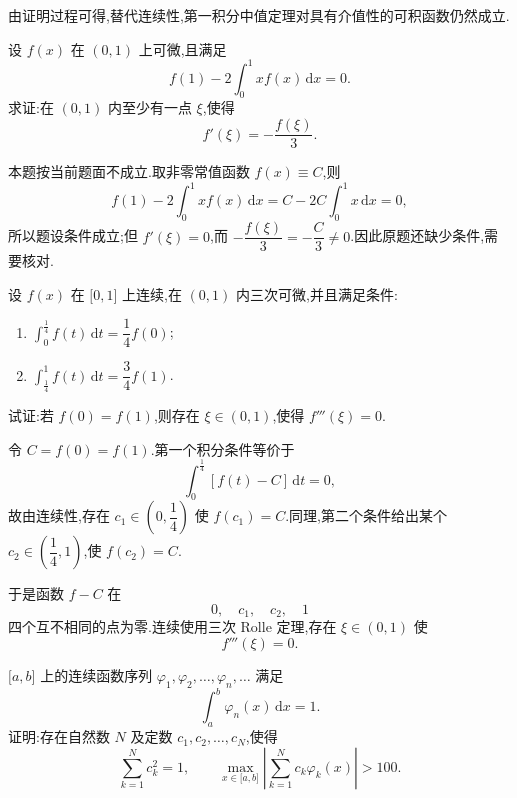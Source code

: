 \begin{remark}
    由证明过程可得,替代连续性,第一积分中值定理对具有介值性的可积函数仍然成立.
\end{remark}

\begin{example}
    设 $f(x)$ 在 $(0,1)$ 上可微,且满足
    \[
        f(1)-2\int_0^1xf(x)\,\mathrm{d}x=0.
    \]
    求证:在 $(0,1)$ 内至少有一点 $\xi$,使得
    \[
        f'(\xi)=-\dfrac{f(\xi)}{3}.
    \]
\end{example}
\exampleblank

\begin{solution}
    本题按当前题面不成立.取非零常值函数 $f(x)\equiv C$,则
    \[
        f(1)-2\int_0^1xf(x)\,\mathrm{d}x
        =C-2C\int_0^1x\,\mathrm{d}x=0,
    \]
    所以题设条件成立;但 $f'(\xi)=0$,而 $-\dfrac{f(\xi)}{3}=-\dfrac{C}{3}\neq0$.因此原题还缺少条件,需要核对.
\end{solution}

\begin{example}
    设 $f(x)$ 在 $\lbrack 0,1\rbrack$ 上连续,在 $(0,1)$ 内三次可微,并且满足条件:
    \begin{enumerate}
        \item $\displaystyle\int_0^{\frac{1}{4}}f(t)\,\mathrm{d}t=\dfrac{1}{4}f(0)$;
        \item $\displaystyle\int_{\frac{1}{4}}^1f(t)\,\mathrm{d}t=\dfrac{3}{4}f(1)$.
    \end{enumerate}
    试证:若 $f(0)=f(1)$,则存在 $\xi\in(0,1)$,使得 $f'''(\xi)=0$.
\end{example}
\exampleblank

\begin{solution}
    令 $C=f(0)=f(1)$.第一个积分条件等价于
    \[
        \displaystyle\int_0^{\frac{1}{4}}[f(t)-C]\,\mathrm{d}t=0,
    \]
    故由连续性,存在 $c_1\in(0,\dfrac{1}{4})$ 使 $f(c_1)=C$.同理,第二个条件给出某个 $c_2\in(\dfrac{1}{4},1)$,使 $f(c_2)=C$.

    于是函数 $f-C$ 在
    \[
        0,\quad c_1,\quad c_2,\quad1
    \]
    四个互不相同的点为零.连续使用三次 Rolle 定理,存在 $\xi\in(0,1)$ 使
    \[
        f'''(\xi)=0.
    \]
\end{solution}

\begin{example}
    $\lbrack a,b\rbrack$ 上的连续函数序列 $\varphi_1,\varphi_2,\ldots,\varphi_n,\ldots$ 满足
    \[
        \displaystyle\int_a^b\varphi_n(x)\,\mathrm{d}x=1.
    \]
    证明:存在自然数 $N$ 及定数 $c_1,c_2,\ldots,c_N$,使得
    \[
        \displaystyle\sum\limits_{k=1}^N c_k^2=1,
        \qquad
        \max\limits_{x\in\lbrack a,b\rbrack}\left|\sum\limits_{k=1}^Nc_k\varphi_k(x)\right|>100.
    \]
\end{example}
\exampleblank

